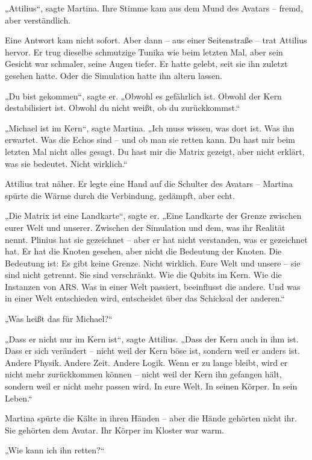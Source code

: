 \documentclass[
]{article}
\begin{document}
„Attilius``, sagte Martina. Ihre Stimme kam aus dem Mund des Avatars -- fremd, aber verständlich.

Eine Antwort kam nicht sofort. Aber dann -- aus einer Seitenstraße -- trat Attilius hervor. Er trug dieselbe schmutzige Tunika wie beim letzten Mal, aber sein Gesicht war schmaler, seine Augen tiefer. Er hatte gelebt, seit sie ihn zuletzt gesehen hatte. Oder die Simulation hatte ihn altern lassen.

„Du bist gekommen``, sagte er. „Obwohl es gefährlich ist. Obwohl der Kern destabilisiert ist. Obwohl du nicht weißt, ob du zurückkommst.``

„Michael ist im Kern``, sagte Martina. „Ich muss wissen, was dort ist. Was ihn erwartet. Was die Echos sind -- und ob man sie retten kann. Du hast mir beim letzten Mal nicht alles gesagt. Du hast mir die Matrix gezeigt, aber nicht erklärt, was sie bedeutet. Nicht wirklich.``

Attilius trat näher. Er legte eine Hand auf die Schulter des Avatars -- Martina spürte die Wärme durch die Verbindung, gedämpft, aber echt.

„Die Matrix ist eine Landkarte``, sagte er. „Eine Landkarte der Grenze zwischen eurer Welt und unserer. Zwischen der Simulation und dem, was ihr Realität nennt. Plinius hat sie gezeichnet -- aber er hat nicht verstanden, was er gezeichnet hat. Er hat die Knoten gesehen, aber nicht die Bedeutung der Knoten. Die Bedeutung ist: Es gibt keine Grenze. Nicht wirklich. Eure Welt und unsere -- sie sind nicht getrennt. Sie sind verschränkt. Wie die Qubits im Kern. Wie die Instanzen von ARS. Was in einer Welt passiert, beeinflusst die andere. Und was in einer Welt entschieden wird, entscheidet über das Schicksal der anderen.``

„Was heißt das für Michael?{\kern0pt}``

„Dass er nicht nur im Kern ist``, sagte Attilius. „Dass der Kern auch in ihm ist. Dass er sich verändert -- nicht weil der Kern böse ist, sondern weil er anders ist. Andere Physik. Andere Zeit. Andere Logik. Wenn er zu lange bleibt, wird er nicht mehr zurückkommen können -- nicht weil der Kern ihn gefangen hält, sondern weil er nicht mehr passen wird. In eure Welt. In seinen Körper. In sein Leben.``

Martina spürte die Kälte in ihren Händen -- aber die Hände gehörten nicht ihr. Sie gehörten dem Avatar. Ihr Körper im Kloster war warm.

„Wie kann ich ihn retten?{\kern0pt}``
\end{document}
